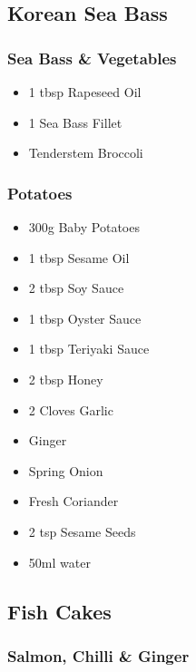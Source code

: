 \documentclass[11pt, english]{article}
\begin{document}
\newpage

	\subsection{Korean Sea Bass}

		\subsubsection*{Sea Bass \& Vegetables}
	
	\begin{itemize}
        \setlength\itemsep{0cm}
                \item 1 tbsp Rapeseed Oil
		\item 1 Sea Bass Fillet
		\item Tenderstem Broccoli
        \end{itemize}

		\subsubsection*{Potatoes}

	\begin{itemize}
        \setlength\itemsep{0cm}
                \item 300g Baby Potatoes
		\item 1 tbsp Sesame Oil
		\item 2 tbsp Soy Sauce
		\item 1 tbsp Oyster Sauce
		\item 1 tbsp Teriyaki Sauce
		\item 2 tbsp Honey
		\item 2 Cloves Garlic
		\item Ginger
		\item Spring Onion
		\item Fresh Coriander
		\item 2 tsp Sesame Seeds
		\item 50ml water
        \end{itemize}

\newpage
	
	\subsection{Fish Cakes}

		\subsubsection*{Salmon, Chilli \& Ginger}
\end{document}
